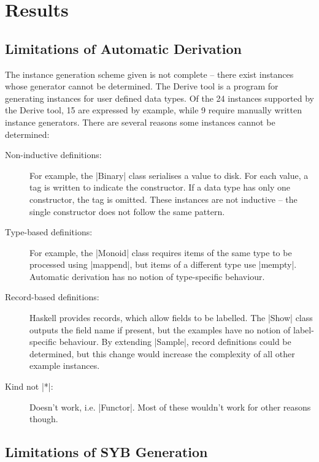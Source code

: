 \documentclass[preprint,draft]{sigplanconf}
\begin{document}
\section{Results}
\label{sec:results}

\subsection{Limitations of Automatic Derivation}
\label{sec:failure}

The instance generation scheme given is not complete -- there exist instances whose generator cannot be determined. The Derive tool \cite{derive} is a program for generating instances for user defined data types. Of the 24 instances supported by the Derive tool, 15 are expressed by example, while 9 require manually written instance generators. There are several reasons some instances cannot be determined:

\begin{description}

\item[Non-inductive definitions:] For example, the |Binary| class serialises a value to disk. For each value, a tag is written to indicate the constructor. If a data type has only one constructor, the tag is omitted. These instances are not inductive -- the single constructor does not follow the same pattern.

\item[Type-based definitions:] For example, the |Monoid| class requires items of the same type to be processed using |mappend|, but items of a different type use |mempty|. Automatic derivation has no notion of type-specific behaviour.

\item[Record-based definitions:] Haskell provides records, which allow fields to be labelled. The |Show| class outputs the field name if present, but the examples have no notion of label-specific behaviour. By extending |Sample|, record definitions could be determined, but this change would increase the complexity of all other example instances.

\item[Kind not |*|:] Doesn't work, i.e. |Functor|. Most of these wouldn't work for other reasons though.

\end{description}

\subsection{Limitations of SYB Generation}
\label{sec:failure_syb}
\end{document}

